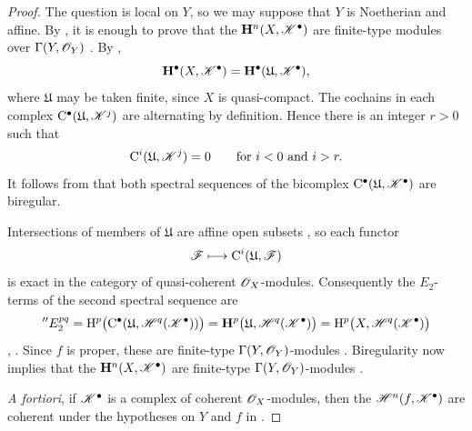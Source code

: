 \begin{proof}
The question is local on $Y$, so we may suppose that $Y$ is
Noetherian and affine.  By , it is enough to prove
that the $\mathbf{H}^n(X,\mathscr{K}^\bullet)$ are finite-type modules
over $\Gamma(Y,\mathscr{O}_Y)$ .  By
,
\[
  \mathbf{H}^\bullet(X,\mathscr{K}^\bullet)
  =
  \mathbf{H}^\bullet(\mathfrak{U},\mathscr{K}^\bullet),
\]
where $\mathfrak{U}$ may be taken finite, since $X$ is
quasi-compact.  The cochains in each complex
$\mathrm{C}^\bullet(\mathfrak{U},\mathscr{K}^j)$ are alternating by
definition.  Hence there is an integer $r>0$ such that
\[
  \mathrm{C}^i(\mathfrak{U},\mathscr{K}^j)=0
  \qquad\text{for }i<0\text{ and }i>r.
\]
It follows from  that both spectral sequences of
the bicomplex
$\mathrm{C}^\bullet(\mathfrak{U},\mathscr{K}^\bullet)$ are biregular.

Intersections of members of $\mathfrak{U}$ are affine open subsets
, so each functor
\[
  \mathscr{F}\longmapsto\mathrm{C}^i(\mathfrak{U},\mathscr{F})
\]
is exact in the category of quasi-coherent $\mathscr{O}_X$-modules.
Consequently the $E_2$-terms of the second spectral sequence are
\[
  ''E_2^{pq}
  =
  \mathrm H^p\bigl(
    \mathrm{C}^\bullet(
      \mathfrak{U},\mathscr{H}^q(\mathscr{K}^\bullet)
    )
  \bigr)
  =
  \mathbf{H}^p\bigl(
    \mathfrak{U},\mathscr{H}^q(\mathscr{K}^\bullet)
  \bigr)
  =
  \mathrm H^p\bigl(X,\mathscr{H}^q(\mathscr{K}^\bullet)\bigr)
\]
, .  Since $f$ is proper, these
are finite-type $\Gamma(Y,\mathscr{O}_Y)$-modules
.  Biregularity now implies that the
$\mathbf{H}^n(X,\mathscr{K}^\bullet)$ are finite-type
$\Gamma(Y,\mathscr{O}_Y)$-modules .

\emph{A fortiori}, if $\mathscr{K}^\bullet$ is a complex of coherent
$\mathscr{O}_X$-modules, then the
$\mathscr{H}^n(f,\mathscr{K}^\bullet)$ are coherent under the
hypotheses on $Y$ and $f$ in 
.
\end{proof}

